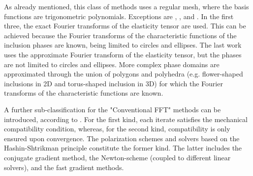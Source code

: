 As already mentioned, this class of methods uses a regular mesh, where the basis functions are trigonometric polynomials.
Exceptions are \cite{bonnet_effective_2007}, \cite{monchiet_polarization-based_2012}, \cite{monchiet_combining_2015} and \cite{nguyen_derivation_2021}.
In the first three, the exact Fourier transforms of the elasticity tensor are used.
This can be achieved because the Fourier transforms of the characteristic functions of the inclusion phases are known, being limited to circles and ellipses.
The last work uses the approximate Fourier transform of the elasticity tensor, but the phases are not limited to circles and ellipses.
More complex phase domains are approximated through the union of polygons and polyhedra (e.g. flower-shaped inclusions in 2D and torus-shaped inclusion in 3D) for which the Fourier transforms of the characteristic functions are known.


A further sub-classification for the "Conventional FFT" methods can be introduced, according to \cite{schneider_barzilai-borwein_2019}.
For the first kind, each iterate satisfies the mechanical compatibility condition, whereas, for the second kind, compatibility is only ensured upon convergence.
The polarization schemes and solvers based on the Hashin-Shtrikman principle constitute the former kind.
The latter includes the conjugate gradient method, the Newton-scheme (coupled to different linear solvers), and the fast gradient methods.

